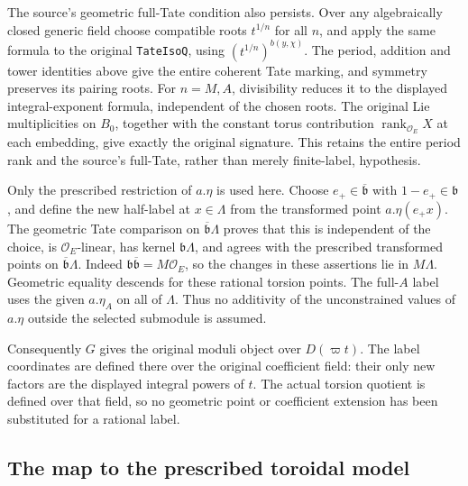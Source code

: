 The source's geometric full-Tate condition also persists.
Over any algebraically closed generic field choose compatible
roots $t^{1/n}$ for all $n$, and apply the same formula to the
original \texttt{TateIsoQ}, using
$(t^{1/n})^{b(y,\chi)}$.  The period, addition and tower
identities above give the entire coherent Tate marking, and
symmetry preserves its pairing roots.  For $n=M,A$, divisibility
reduces it to the displayed integral-exponent formula, independent
of the chosen roots.  The original Lie multiplicities on $B_0$,
together with the constant torus contribution
$\operatorname{rank}_{\mathcal O_E}X$ at each embedding, give
exactly the original signature.  This retains the entire period
rank and the source's full-Tate, rather than merely finite-label,
hypothesis.

Only the prescribed restriction of $a.\eta$ is used here.
Choose $e_+\in\overline{\mathfrak b}$ with
$1-e_+\in\mathfrak b$, and define the new half-label at
$x\in\Lambda$ from the transformed point $a.\eta(e_+x)$.
The geometric Tate comparison on
$\overline{\mathfrak b}\Lambda$ proves that this is independent
of the choice, is $\mathcal O_E$-linear, has kernel
$\mathfrak b\Lambda$, and agrees with the prescribed transformed
points on $\overline{\mathfrak b}\Lambda$.
Indeed $\mathfrak b\overline{\mathfrak b}=M\mathcal O_E$,
so the changes in these assertions lie in $M\Lambda$.
Geometric equality descends for these rational torsion points.
The full-$A$ label uses the given $a.\eta_A$ on all of $\Lambda$.
Thus no additivity of the unconstrained values of $a.\eta$
outside the selected submodule is assumed.

Consequently $G$ gives the original moduli object over
$D(\varpi t)$.  The label coordinates are defined there over
the original coefficient field: their only new factors are
the displayed integral powers of $t$.  The actual torsion
quotient is defined over that field, so no geometric point or
coefficient extension has been substituted for a rational label.

\subsection*{The map to the prescribed toroidal model}

